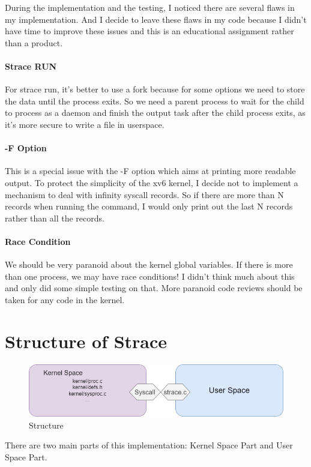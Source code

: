 \documentclass[11pt,oneside,a4paper]{article}
\begin{document}
During the implementation and the testing, I noticed there are several flaws in my 
implementation. And I decide to leave these flaws in my code 
because I didn't have time to improve these issues and this is an educational assignment
rather than a product.

\paragraph*{Strace RUN}
For strace run, it's better to use a fork because for some options we need to store the 
data until the process exits. So we need a parent process to wait for the child to process 
as a daemon and finish the output task after the child process exits, as it's more 
secure to write a file in userspace.

\paragraph*{-F Option}
This is a special issue with the -F option which aims at printing more readable output.
To protect the simplicity of the xv6 kernel, I decide not to implement a mechanism
to deal with infinity syscall records. So if there are more than N records when running
the command, I would only print out the last N records rather than all the records.

\paragraph*{Race Condition}
We should be very paranoid about the kernel global variables. If there is more than one
process, we may have race conditions! I didn't think much about this and only did some
simple testing on that. More paranoid code reviews should be taken for any code in the kernel.


\section{Structure of Strace}

\begin{figure}[H]
    \includegraphics[width=4.75in]{1-36.png}
    \centering
    \caption{Structure}
\end{figure}
There are two main parts of this implementation: Kernel Space Part and User Space Part.
\end{document}
